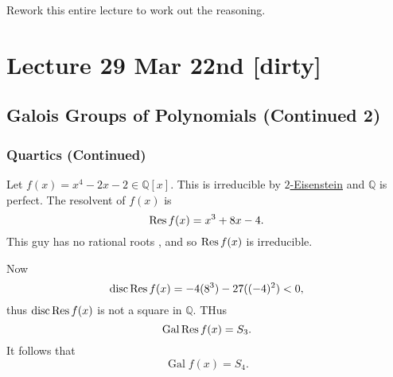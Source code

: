 \documentclass[notoc,notitlepage,nobib]{tufte-book}
\DeclareMathOperator{\disc}{disc}
\DeclareMathOperator{\Gal}{Gal}
\begin{document}
\begin{note}
  Rework this entire lecture to work out the reasoning.
\end{note}





\chapter{Lecture 29 Mar 22nd [dirty]}%
\label{chp:lecture_29_mar_22nd}

\section{Galois Groups of Polynomials (Continued 2)}%
\label{sec:galois_groups_of_polynomials_continued_2}

\subsection{Quartics (Continued)}%
\label{sub:quartics_continued}

\begin{eg}
  Let $f(x) = x^4 - 2x - 2 \in \mathbb{Q}[x]$. This is irreducible by
  \hyperref[propo:eisenstein_s_criterion]{$2$-Eisenstein} and $\mathbb{Q}$ is
  perfect. The resolvent of $f(x)$ is
  \begin{equation*}
    \operatorname{Res} f(x) = x^3 + 8x - 4.
  \end{equation*}
  This guy has no rational roots , and so $\operatorname{Res} f(x)$ is
  irreducible.

  Now
  \begin{equation*}
    \disc \Res f(x) = -4(8^3) - 27((-4)^2) < 0,
  \end{equation*}
  thus $\disc \Res f(x)$ is not a square in $\mathbb{Q}$. THus
  \begin{equation*}
    \Gal \Res f(x) = S_3.
  \end{equation*}
  It follows that
  \begin{equation*}
    \Gal f(x) = S_4.
  \end{equation*}
\end{eg}
\end{document}
